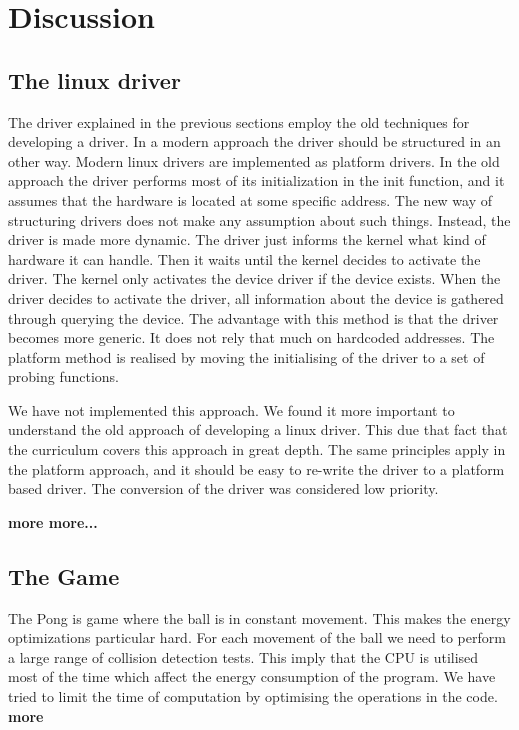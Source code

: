 \section{Discussion}


\subsection{The linux driver}
The driver explained in the previous sections employ the old techniques for developing a driver. In a modern approach the driver should be structured in an other way. Modern linux drivers are implemented as platform drivers. In the old approach the driver performs most of its initialization in the init function, and it assumes that the hardware is located at some specific address. The new way of structuring drivers does not make any assumption about such things. Instead, the driver is made more dynamic. The driver just informs the kernel what kind of hardware it can handle. Then it waits until the kernel decides to activate the driver. The kernel only activates the device driver if the device exists. When the driver decides to activate the driver, all information about the device is gathered through querying the device. The advantage with this method is that the driver becomes more generic. It does not rely that much on hardcoded addresses. The platform method is realised by moving the initialising  of the driver to a set of probing functions. 

We have not implemented this approach. We found it more important to understand the old approach of developing a linux driver. This due that fact that the curriculum covers this approach in great depth. The same principles apply in the platform approach, and it should be easy to re-write the driver to a platform based driver. The conversion of the driver was considered low priority. 

{\bf more more...}



\subsection{The Game}
The Pong is game where the ball is in constant movement. This makes the energy optimizations particular hard. For each movement of the ball we need to perform a large range of collision detection tests. This imply that the CPU is utilised most of the time which affect the energy consumption of the program. We have tried to limit the time of computation by optimising the operations in the code. {\bf more}










